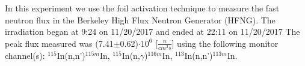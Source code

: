 In this experiment we use the foil activation technique to measure the fast neutron flux in the Berkeley High Flux Neutron Generator (HFNG).  The irradiation began at 9:24 on 11/20/2017 and ended at 22:11 on 11/20/2017  The peak flux measured was (7.41$\pm$0.62)$\cdot 10^6$ [$\frac{n}{cm^2s}$] using the following monitor channel(s): $^{115}$In(n,n')$^{115m}$In, $^{115}$In(n,$\gamma$)$^{116m}$In, $^{113}$In(n,n')$^{113m}$In.